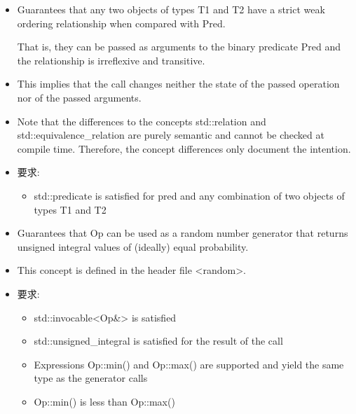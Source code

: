
\begin{itemize}
\item
Guarantees that any two objects of types T1 and T2 have a strict weak ordering relationship when compared with Pred.

That is, they can be passed as arguments to the binary predicate Pred and the relationship is irreflexive and transitive.

\item
This implies that the call changes neither the state of the passed operation nor of the passed arguments.

\item
Note that the differences to the concepts std::relation and std::equivalence\_relation are purely semantic and cannot be checked at compile time. Therefore, the concept differences only document the intention.

\item
要求:
\begin{itemize}
\item
std::predicate is satisfied for pred and any combination of two objects of types T1 and T2
\end{itemize}
\end{itemize}


\begin{itemize}
\item
Guarantees that Op can be used as a random number generator that returns unsigned integral values of (ideally) equal probability.

\item
This concept is defined in the header file <random>.

\item
要求:
\begin{itemize}
\item
std::invocable<Op\&> is satisfied

\item
std::unsigned\_integral is satisfied for the result of the call

\item
Expressions Op::min() and Op::max() are supported and yield the same type as the generator calls

\item
 Op::min() is less than Op::max()
\end{itemize}
\end{itemize}

